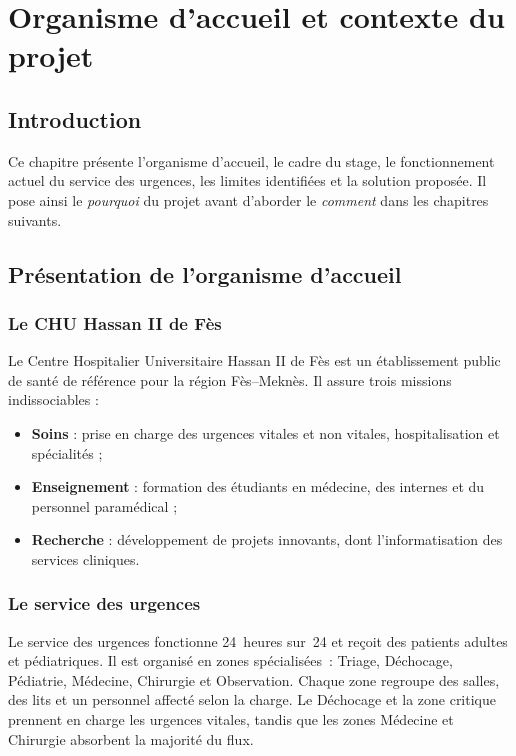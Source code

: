 \chapter{Organisme d'accueil et contexte du projet}

\section{Introduction}

Ce chapitre présente l'organisme d'accueil, le cadre du stage, le fonctionnement actuel du service des urgences, les limites identifiées et la solution proposée. Il pose ainsi le \textit{pourquoi} du projet avant d'aborder le \textit{comment} dans les chapitres suivants.

\section{Présentation de l'organisme d'accueil}

\subsection{Le CHU Hassan II de Fès}

Le Centre Hospitalier Universitaire Hassan II de Fès est un établissement public de santé de référence pour la région Fès--Meknès. Il assure trois missions indissociables :

\begin{itemize}
    \item \textbf{Soins} : prise en charge des urgences vitales et non vitales, hospitalisation et spécialités ;
    \item \textbf{Enseignement} : formation des étudiants en médecine, des internes et du personnel paramédical ;
    \item \textbf{Recherche} : développement de projets innovants, dont l'informatisation des services cliniques.
\end{itemize}

\subsection{Le service des urgences}

Le service des urgences fonctionne 24~heures sur~24 et reçoit des patients adultes et pédiatriques. Il est organisé en zones spécialisées~: Triage, Déchocage, Pédiatrie, Médecine, Chirurgie et Observation. Chaque zone regroupe des salles, des lits et un personnel affecté selon la charge. Le Déchocage et la zone critique prennent en charge les urgences vitales, tandis que les zones Médecine et Chirurgie absorbent la majorité du flux.

